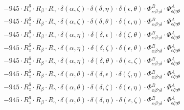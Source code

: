 \documentclass{article}
\begin{document}
\begin{equation}
\begin{array}{c}
 \\[0.2em] 		 - 945 \cdot R_{z}^{6} \cdot R_{\beta{}} \cdot R_{\gamma{}} \cdot \delta{}\left(\alpha{}, \zeta{}\right) \cdot \delta{}\left(\delta{}, \eta{}\right) \cdot \delta{}\left(\epsilon{}, \theta{}\right) \cdot \Phi{}^{B}_{\alpha{}\beta{}\gamma{}\delta{}} \cdot \Phi{}^{A}_{\epsilon{}\zeta{}\eta{}\theta{}} 
 \\[0.2em] 		 - 945 \cdot R_{z}^{6} \cdot R_{\beta{}} \cdot R_{\gamma{}} \cdot \delta{}\left(\alpha{}, \zeta{}\right) \cdot \delta{}\left(\delta{}, \theta{}\right) \cdot \delta{}\left(\epsilon{}, \eta{}\right) \cdot \Phi{}^{B}_{\alpha{}\beta{}\gamma{}\delta{}} \cdot \Phi{}^{A}_{\epsilon{}\zeta{}\eta{}\theta{}} 
 \\[0.2em] 		 - 945 \cdot R_{z}^{6} \cdot R_{\beta{}} \cdot R_{\gamma{}} \cdot \delta{}\left(\alpha{}, \eta{}\right) \cdot \delta{}\left(\delta{}, \epsilon{}\right) \cdot \delta{}\left(\zeta{}, \theta{}\right) \cdot \Phi{}^{B}_{\alpha{}\beta{}\gamma{}\delta{}} \cdot \Phi{}^{A}_{\epsilon{}\zeta{}\eta{}\theta{}} 
 \\[0.2em] 		 - 945 \cdot R_{z}^{6} \cdot R_{\beta{}} \cdot R_{\gamma{}} \cdot \delta{}\left(\alpha{}, \eta{}\right) \cdot \delta{}\left(\delta{}, \zeta{}\right) \cdot \delta{}\left(\epsilon{}, \theta{}\right) \cdot \Phi{}^{B}_{\alpha{}\beta{}\gamma{}\delta{}} \cdot \Phi{}^{A}_{\epsilon{}\zeta{}\eta{}\theta{}} 
 \\[0.2em] 		 - 945 \cdot R_{z}^{6} \cdot R_{\beta{}} \cdot R_{\gamma{}} \cdot \delta{}\left(\alpha{}, \eta{}\right) \cdot \delta{}\left(\delta{}, \theta{}\right) \cdot \delta{}\left(\epsilon{}, \zeta{}\right) \cdot \Phi{}^{B}_{\alpha{}\beta{}\gamma{}\delta{}} \cdot \Phi{}^{A}_{\epsilon{}\zeta{}\eta{}\theta{}} 
 \\[0.2em] 		 - 945 \cdot R_{z}^{6} \cdot R_{\beta{}} \cdot R_{\gamma{}} \cdot \delta{}\left(\alpha{}, \theta{}\right) \cdot \delta{}\left(\delta{}, \epsilon{}\right) \cdot \delta{}\left(\zeta{}, \eta{}\right) \cdot \Phi{}^{B}_{\alpha{}\beta{}\gamma{}\delta{}} \cdot \Phi{}^{A}_{\epsilon{}\zeta{}\eta{}\theta{}} 
 \\[0.2em] 		 - 945 \cdot R_{z}^{6} \cdot R_{\beta{}} \cdot R_{\gamma{}} \cdot \delta{}\left(\alpha{}, \theta{}\right) \cdot \delta{}\left(\delta{}, \zeta{}\right) \cdot \delta{}\left(\epsilon{}, \eta{}\right) \cdot \Phi{}^{B}_{\alpha{}\beta{}\gamma{}\delta{}} \cdot \Phi{}^{A}_{\epsilon{}\zeta{}\eta{}\theta{}} 
 \\[0.2em] 		 - 945 \cdot R_{z}^{6} \cdot R_{\beta{}} \cdot R_{\gamma{}} \cdot \delta{}\left(\alpha{}, \theta{}\right) \cdot \delta{}\left(\delta{}, \eta{}\right) \cdot \delta{}\left(\epsilon{}, \zeta{}\right) \cdot \Phi{}^{B}_{\alpha{}\beta{}\gamma{}\delta{}} \cdot \Phi{}^{A}_{\epsilon{}\zeta{}\eta{}\theta{}} 

\end{array}
\end{equation}
\end{document}
